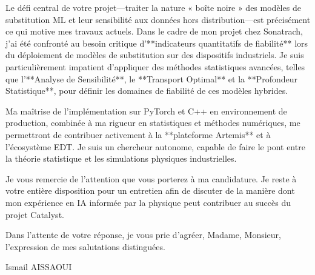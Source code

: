 \documentclass[11pt,a4paper]{article}
\begin{document}
Le défi central de votre projet—traiter la nature « boîte noire » des modèles de substitution ML et leur sensibilité aux données hors distribution—est précisément ce qui motive mes travaux actuels. Dans le cadre de mon projet chez Sonatrach, j'ai été confronté au besoin critique d'**indicateurs quantitatifs de fiabilité** lors du déploiement de modèles de substitution sur des dispositifs industriels. Je suis particulièrement impatient d'appliquer des méthodes statistiques avancées, telles que l'**Analyse de Sensibilité**, le **Transport Optimal** et la **Profondeur Statistique**, pour définir les domaines de fiabilité de ces modèles hybrides.

Ma maîtrise de l'implémentation sur PyTorch et C++ en environnement de production, combinée à ma rigueur en statistiques et méthodes numériques, me permettront de contribuer activement à la **plateforme Artemis** et à l'écosystème EDT. Je suis un chercheur autonome, capable de faire le pont entre la théorie statistique et les simulations physiques industrielles.

Je vous remercie de l'attention que vous porterez à ma candidature. Je reste à votre entière disposition pour un entretien afin de discuter de la manière dont mon expérience en IA informée par la physique peut contribuer au succès du projet Catalyst.

Dans l'attente de votre réponse, je vous prie d'agréer, Madame, Monsieur, l'expression de mes salutations distinguées.

\bigskip

\noindent Ismail AISSAOUI
\end{document}
